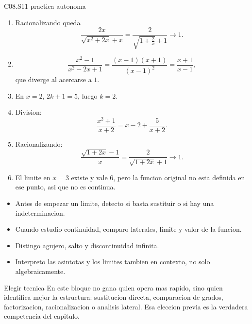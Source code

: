 \begin{fullsolution}{C08.S11 practica autonoma}
\begin{enumerate}[label=\textbf{PX-C08.S11-\arabic*:}, leftmargin=*]
  \item Racionalizando queda
  \[
  \frac{2x}{\sqrt{x^2+2x}+x}=\frac{2}{\sqrt{1+\frac{2}{x}}+1}\to 1.
  \]
  \item
  \[
  \frac{x^2-1}{x^2-2x+1}=\frac{(x-1)(x+1)}{(x-1)^2}=\frac{x+1}{x-1},
  \]
  que diverge al acercarse a \(1\).
  \item En \(x=2\), \(2k+1=5\), luego \(k=2\).
  \item Division:
  \[
  \frac{x^2+1}{x+2}=x-2+\frac{5}{x+2}.
  \]
  \item Racionalizando:
  \[
  \frac{\sqrt{1+2x}-1}{x}=\frac{2}{\sqrt{1+2x}+1}\to 1.
  \]
  \item El limite en \(x=3\) existe y vale \(6\), pero la funcion original no esta definida en
  ese punto, asi que no es continua.
\end{enumerate}
\end{fullsolution}

\begin{selfcheck}
\begin{itemize}
  \item Antes de empezar un limite, detecto si basta sustituir o si hay una indeterminacion.
  \item Cuando estudio continuidad, comparo laterales, limite y valor de la funcion.
  \item Distingo agujero, salto y discontinuidad infinita.
  \item Interpreto las asintotas y los limites tambien en contexto, no solo algebraicamente.
\end{itemize}
\end{selfcheck}

\begin{extension}{Elegir tecnica}
En este bloque no gana quien opera mas rapido, sino quien identifica mejor la estructura:
sustitucion directa, comparacion de grados, factorizacion, racionalizacion o analisis lateral.
Esa eleccion previa es la verdadera competencia del capitulo.
\end{extension}
